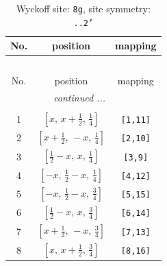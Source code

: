 \documentclass[fleqn,8pt]{jsarticle}
\begin{document}
\renewcommand{\arraystretch}{1.2}
\begin{longtable}{ccc}
\caption{Wyckoff site: {\tt 8g}, site symmetry: {\tt ..2'}}
 \\
 \hline \hline
No. & position & mapping \\ \hline \endfirsthead

\multicolumn{2}{l}{\tablename\ \thetable{}} \\
 \hline \hline
No. & position & mapping \\ \hline \endhead

 \hline \hline
\multicolumn{2}{r}{\footnotesize\it continued ...} \\ \endfoot

 \hline \hline
\multicolumn{2}{r}{} \\ \endlastfoot

1 & $\left[ x,\, x + \frac{1}{2},\, \frac{1}{4} \right]$ & {\tt [1,11]} \\ \hline
2 & $\left[ x + \frac{1}{2},\, - x,\, \frac{1}{4} \right]$ & {\tt [2,10]} \\ \hline
3 & $\left[ \frac{1}{2} - x,\, x,\, \frac{1}{4} \right]$ & {\tt [3,9]} \\ \hline
4 & $\left[ - x,\, \frac{1}{2} - x,\, \frac{1}{4} \right]$ & {\tt [4,12]} \\ \hline
5 & $\left[ - x,\, \frac{1}{2} - x,\, \frac{3}{4} \right]$ & {\tt [5,15]} \\ \hline
6 & $\left[ \frac{1}{2} - x,\, x,\, \frac{3}{4} \right]$ & {\tt [6,14]} \\ \hline
7 & $\left[ x + \frac{1}{2},\, - x,\, \frac{3}{4} \right]$ & {\tt [7,13]} \\ \hline
8 & $\left[ x,\, x + \frac{1}{2},\, \frac{3}{4} \right]$ & {\tt [8,16]} \\
\end{longtable}
\renewcommand{\arraystretch}{1.2}
\end{document}
